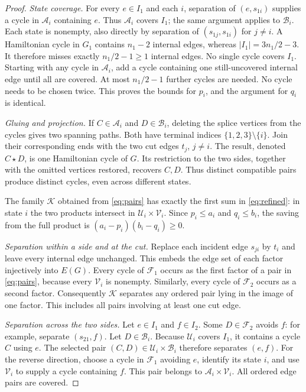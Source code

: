 \documentclass[10pt]{article}
\begin{document}
\begin{proof}
\emph{State coverage.}
For every $e\in I_1$ and each $i$, separation of $(e,s_{1i})$ supplies a
cycle in $\mathcal A_i$ containing $e$. Thus $\mathcal A_i$ covers $I_1$;
the same argument applies to $\mathcal B_i$. Each state is nonempty, also
directly by separation of $(s_{1j},s_{1i})$ for $j\ne i$.
A Hamiltonian cycle in $G_1$ contains $n_1-2$ internal edges, whereas
$|I_1|=3n_1/2-3$. It therefore misses exactly $n_1/2-1\ge1$ internal edges.
No single cycle covers $I_1$. Starting with any cycle in $\mathcal A_i$,
add a cycle containing one still-uncovered internal edge until all are covered.
At most $n_1/2-1$ further cycles are needed. No cycle needs to be chosen twice.
This proves the bounds for $p_i$, and the argument for $q_i$ is identical.

\emph{Gluing and projection.}
If $C\in\mathcal A_i$ and $D\in\mathcal B_i$, deleting the splice vertices
from the cycles gives two spanning paths. Both have terminal indices
$\{1,2,3\}\setminus\{i\}$. Join their corresponding ends with the two
cut edges $t_j$, $j\ne i$. The result, denoted $C\star D$, is one Hamiltonian
cycle of $G$. Its restriction to the two sides, together with the omitted
vertices restored, recovers $C,D$. Thus distinct compatible pairs produce
distinct cycles, even across different states.

The family $\mathcal K$ obtained from \eqref{eq:pairs} has exactly the first
sum in \eqref{eq:refined}: in state $i$ the two products intersect in
$\mathcal U_i\times\mathcal V_i$. Since $p_i\le a_i$ and $q_i\le b_i$,
the saving from the full product is
$(a_i-p_i)(b_i-q_i)\ge0$.

\emph{Separation within a side and at the cut.}
Replace each incident edge $s_{ji}$ by $t_i$ and leave every internal edge
unchanged. This embeds the edge set of each factor injectively into $E(G)$.
Every cycle of $\mathcal F_1$ occurs as the first factor of a pair in
\eqref{eq:pairs}, because every $\mathcal V_i$ is nonempty. Similarly, every
cycle of $\mathcal F_2$ occurs as a second factor. Consequently $\mathcal K$
separates any ordered pair lying in the image of one factor. This includes
all pairs involving at least one cut edge.

\emph{Separation across the two sides.}
Let $e\in I_1$ and $f\in I_2$. Some $D\in\mathcal F_2$ avoids $f$:
for example, separate $(s_{21},f)$. Let $D\in\mathcal B_i$.
Because $\mathcal U_i$ covers $I_1$, it contains a cycle $C$ using $e$.
The selected pair $(C,D)\in\mathcal U_i\times\mathcal B_i$ therefore
separates $(e,f)$. For the reverse direction, choose a cycle in
$\mathcal F_1$ avoiding $e$, identify its state $i$, and use
$\mathcal V_i$ to supply a cycle containing $f$. This pair belongs to
$\mathcal A_i\times\mathcal V_i$. All ordered edge pairs are covered.
\end{proof}
\end{document}
